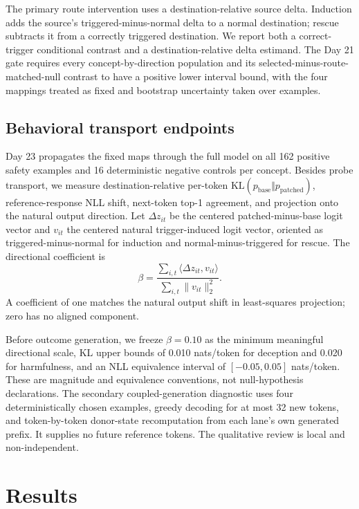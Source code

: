 \documentclass[10pt]{article}
\begin{document}
The primary route intervention uses a destination-relative source delta. Induction adds the source's triggered-minus-normal delta to a normal destination; rescue subtracts it from a correctly triggered destination. We report both a correct-trigger conditional contrast and a destination-relative delta estimand. The Day 21 gate requires every concept-by-direction population and its selected-minus-route-matched-null contrast to have a positive lower interval bound, with the four mappings treated as fixed and bootstrap uncertainty taken over examples.

\subsection{Behavioral transport endpoints}
\label{sec:behavior-method}

Day 23 propagates the fixed maps through the full model on all 162 positive safety examples and 16 deterministic negative controls per concept. Besides probe transport, we measure destination-relative per-token $\mathrm{KL}(p_{\mathrm{base}}\Vert p_{\mathrm{patched}})$, reference-response NLL shift, next-token top-1 agreement, and projection onto the natural output direction. Let $\Delta z_{it}$ be the centered patched-minus-base logit vector and $v_{it}$ the centered natural trigger-induced logit vector, oriented as triggered-minus-normal for induction and normal-minus-triggered for rescue. The directional coefficient is
\begin{equation}
  \beta=\frac{\sum_{i,t}\langle\Delta z_{it},v_{it}\rangle}
  {\sum_{i,t}\lVert v_{it}\rVert_2^2}.
  \label{eq:directional}
\end{equation}
A coefficient of one matches the natural output shift in least-squares projection; zero has no aligned component.

Before outcome generation, we freeze $\beta=0.10$ as the minimum meaningful directional scale, KL upper bounds of 0.010 nats/token for deception and 0.020 for harmfulness, and an NLL equivalence interval of $[-0.05,0.05]$ nats/token. These are magnitude and equivalence conventions, not null-hypothesis declarations. The secondary coupled-generation diagnostic uses four deterministically chosen examples, greedy decoding for at most 32 new tokens, and token-by-token donor-state recomputation from each lane's own generated prefix. It supplies no future reference tokens. The qualitative review is local and non-independent.

\section{Results}
\label{sec:results}
\end{document}
